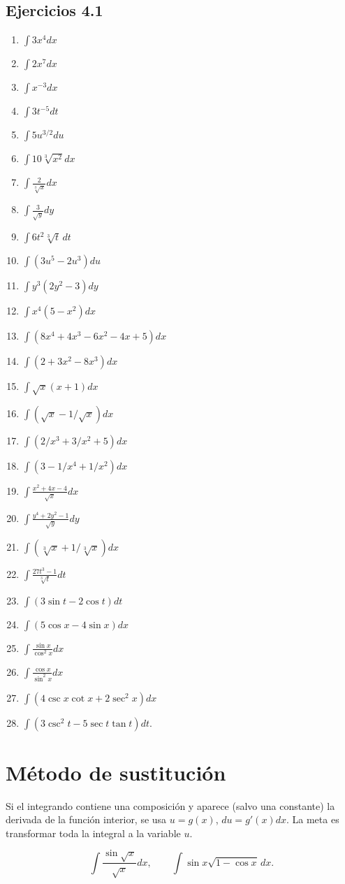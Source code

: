 \documentclass[11pt]{article}
\begin{document}
\subsection*{Ejercicios 4.1}
\begin{enumerate}[itemsep=3pt]
\item $\int3x^4dx$ \item $\int2x^7dx$ \item $\int x^{-3}dx$ \item $\int3t^{-5}dt$
\item $\int5u^{3/2}du$ \item $\int10\sqrt[3]{x^2}dx$ \item $\int\frac2{\sqrt[3]x}dx$ \item $\int\frac3{\sqrt y}dy$
\item $\int6t^2\sqrt[3]t\,dt$ \item $\int(3u^5-2u^3)du$ \item $\int y^3(2y^2-3)dy$ \item $\int x^4(5-x^2)dx$
\item $\int(8x^4+4x^3-6x^2-4x+5)dx$ \item $\int(2+3x^2-8x^3)dx$ \item $\int\sqrt{x}(x+1)dx$
\item $\int(\sqrt x-1/\sqrt x)dx$ \item $\int(2/x^3+3/x^2+5)dx$ \item $\int(3-1/x^4+1/x^2)dx$
\item $\int\frac{x^2+4x-4}{\sqrt x}dx$ \item $\int\frac{y^4+2y^2-1}{\sqrt y}dy$ \item $\int(\sqrt[3]x+1/\sqrt[3]x)dx$
\item $\int\frac{27t^3-1}{\sqrt[3]t}dt$ \item $\int(3\sin t-2\cos t)dt$ \item $\int(5\cos x-4\sin x)dx$
\item $\int\frac{\sin x}{\cos^2x}dx$ \item $\int\frac{\cos x}{\sin^2x}dx$ \item $\int(4\csc x\cot x+2\sec^2x)dx$ \item $\int(3\csc^2t-5\sec t\tan t)dt$.
\end{enumerate}

\section{Método de sustitución}
\begin{nota}[Sustitución]
Si el integrando contiene una composición y aparece (salvo una constante) la derivada de la función interior, se usa $u=g(x)$, $du=g'(x)dx$. La meta es transformar toda la integral a la variable $u$.
\end{nota}
\begin{ejemplo}
\[\int\frac{\sin\sqrt{x}}{\sqrt{x}}dx,\qquad \int\sin x\sqrt{1-\cos x}\,dx.\]
\end{ejemplo}
\end{document}
